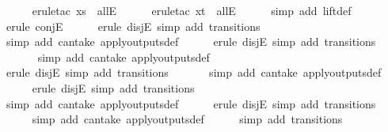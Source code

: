 \begin{isabellebody}
\ \ \ \ \isamarkupfalse%
\ {\isacharparenleft}erule{\isacharunderscore}tac\ x{\isacharequal}s{\isacharprime}\ \ allE{\isacharparenright}\isanewline
\ \ \ \ \isamarkupfalse%
\ {\isacharparenleft}erule{\isacharunderscore}tac\ x{\isacharequal}t\ \ allE{\isacharparenright}\isanewline
\ \ \ \ \isamarkupfalse%
\ {\isacharparenleft}simp\ add{\isacharcolon}\ lift{\isacharunderscore}def{\isacharparenright}\isanewline
\ \ \ \ \isamarkupfalse%
\ {\isacharparenleft}erule\ conjE{\isacharparenright}{\isacharplus}\isanewline
\ \ \ \ \isamarkupfalse%
\ {\isacharparenleft}erule\ disjE{\isacharcomma}\ simp\ add{\isacharcolon}\ transitions{\isacharparenright}{\isacharplus}\isanewline
\ \ \ \ \ \isamarkupfalse%
\ {\isacharparenleft}simp\ add{\isacharcolon}\ can{\isacharunderscore}take\ apply{\isacharunderscore}outputs{\isacharunderscore}def{\isacharparenright}\isanewline
\ \ \ \ \isamarkupfalse%
\ {\isacharparenleft}erule\ disjE{\isacharcomma}\ simp\ add{\isacharcolon}\ transitions{\isacharparenright}{\isacharplus}\isanewline
\ \ \ \ \ \isamarkupfalse%
\ {\isacharparenleft}simp\ add{\isacharcolon}\ can{\isacharunderscore}take\ apply{\isacharunderscore}outputs{\isacharunderscore}def{\isacharparenright}\isanewline
\ \ \ \ \isamarkupfalse%
\ {\isacharparenleft}erule\ disjE{\isacharcomma}\ simp\ add{\isacharcolon}\ transitions{\isacharparenright}{\isacharplus}\isanewline
\ \ \ \ \ \isamarkupfalse%
\ {\isacharparenleft}simp\ add{\isacharcolon}\ can{\isacharunderscore}take\ apply{\isacharunderscore}outputs{\isacharunderscore}def{\isacharparenright}\isanewline
\ \ \ \ \isamarkupfalse%
\ {\isacharparenleft}erule\ disjE{\isacharcomma}\ simp\ add{\isacharcolon}\ transitions{\isacharparenright}{\isacharplus}\isanewline
\ \ \ \ \ \isamarkupfalse%
\ {\isacharparenleft}simp\ add{\isacharcolon}\ can{\isacharunderscore}take\ apply{\isacharunderscore}outputs{\isacharunderscore}def{\isacharparenright}\isanewline
\ \ \ \ \isamarkupfalse%
\ {\isacharparenleft}erule\ disjE{\isacharcomma}\ simp\ add{\isacharcolon}\ transitions{\isacharparenright}{\isacharplus}\isanewline
\ \ \ \ \isamarkupfalse%
\ {\isacharparenleft}simp\ add{\isacharcolon}\ can{\isacharunderscore}take\ apply{\isacharunderscore}outputs{\isacharunderscore}def{\isacharparenright}\isanewline
\ \ \ \ \isamarkupfalse%
\ {\isacharparenleft}simp\ add{\isacharcolon}\ transitions{\isacharparenright}\isanewline

\end{isabellebody}
